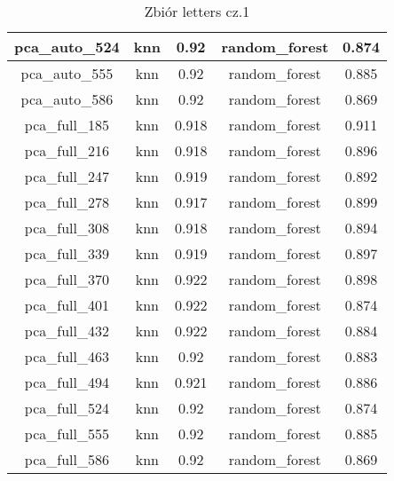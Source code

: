 \documentclass{classrep}
\begin{document}
{{{\begin{table}[!htbp]
\begin{tabular}{|c|c|c|c|c|}
                        pca\_auto\_524 & knn & 0.92 & random\_forest & 0.874 \\ \hline
                        pca\_auto\_555 & knn & 0.92 & random\_forest & 0.885 \\ \hline
                        pca\_auto\_586 & knn & 0.92 & random\_forest & 0.869 \\ \hline
                        pca\_full\_185 & knn & 0.918 & random\_forest & 0.911 \\ \hline
                        pca\_full\_216 & knn & 0.918 & random\_forest & 0.896 \\ \hline
                        pca\_full\_247 & knn & 0.919 & random\_forest & 0.892 \\ \hline
                        pca\_full\_278 & knn & 0.917 & random\_forest & 0.899 \\ \hline
                        pca\_full\_308 & knn & 0.918 & random\_forest & 0.894 \\ \hline
                        pca\_full\_339 & knn & 0.919 & random\_forest & 0.897 \\ \hline
                        pca\_full\_370 & knn & 0.922 & random\_forest & 0.898 \\ \hline
                        pca\_full\_401 & knn & 0.922 & random\_forest & 0.874 \\ \hline
                        pca\_full\_432 & knn & 0.922 & random\_forest & 0.884 \\ \hline
                        pca\_full\_463 & knn & 0.92 & random\_forest & 0.883 \\ \hline
                        pca\_full\_494 & knn & 0.921 & random\_forest & 0.886 \\ \hline
                        pca\_full\_524 & knn & 0.92 & random\_forest & 0.874 \\ \hline
                        pca\_full\_555 & knn & 0.92 & random\_forest & 0.885 \\ \hline
                        pca\_full\_586 & knn & 0.92 & random\_forest & 0.869 \\ \hline
                    \end{tabular}
                    \caption
                    {Zbiór letters cz.1}
                    \label{table_principal_component_analysis_letters_1}
                \end{table}
                \FloatBarrier

}}}
\end{document}

